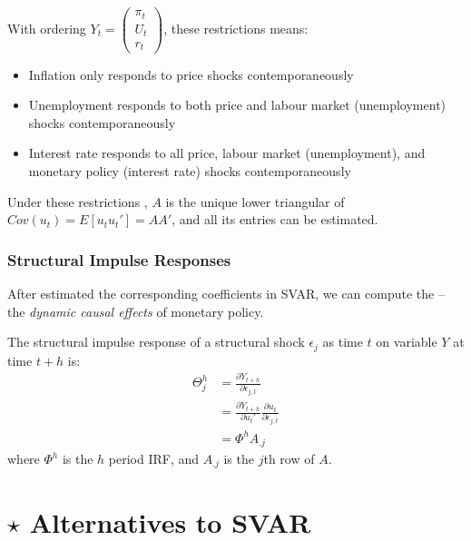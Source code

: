             With ordering $Y_t=\begin{pmatrix}
                \pi_t\\
                U_t\\
                r_t
            \end{pmatrix}$, these restrictions means:
            \begin{itemize}
                \item Inflation only responds to price shocks contemporaneously
                \item Unemployment responds to both price and labour market (unemployment) shocks contemporaneously
                \item Interest rate responds to all price, labour market (unemployment), and monetary policy (interest rate) shocks contemporaneously
            \end{itemize}
            
            Under these restrictions , $A$ is the unique lower triangular  of $Cov(u_t)=E[u_tu_t']=AA'$, and all its entries can be estimated.

        \subsubsection{Structural Impulse Responses}

            After estimated the corresponding coefficients in SVAR, we can compute the  -- the \emph{dynamic causal effects} of monetary policy.

            The structural impulse response of a structural shock $\epsilon_j$ as time $t$ on variable $Y$ at time $t+h$ is:
            \begin{align*}
                \Theta_j^h &= \frac{\partial Y_{t+h}}{\partial \epsilon_{j,t}}\\
                &= \frac{\partial Y_{t+h}}{\partial u_t'}\frac{\partial u_t}{\partial \epsilon_{j,t}} \tag{Chain Rule}\\
                &=\Phi^h A_{.j}
            \end{align*}
            where $\Phi^h$ is the $h$ period IRF, and $A_{.j}$ is the $j$th row of $A$.
            
    \section{$\star$ Alternatives to SVAR}
    
